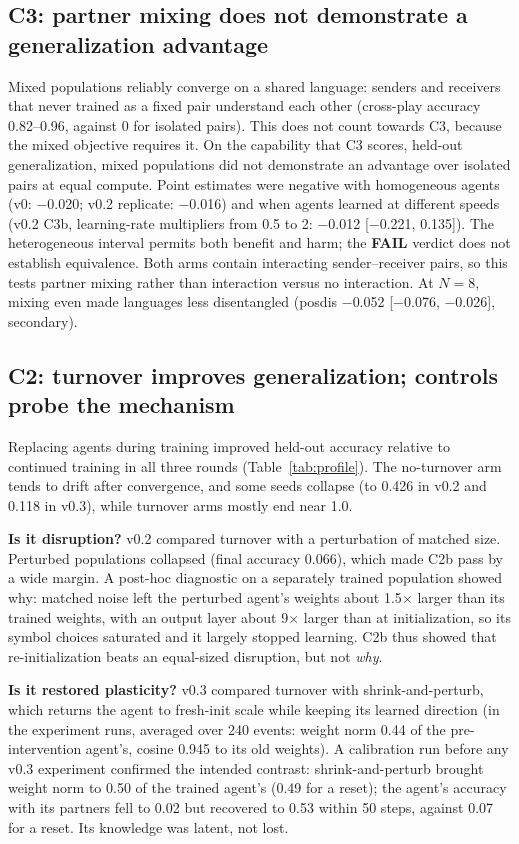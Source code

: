 \documentclass[11pt]{article}
\newcommand{\fail}{\textbf{FAIL}}
\begin{document}
\subsection{C3: partner mixing does not demonstrate a generalization advantage}
Mixed populations reliably converge on a shared language: senders and receivers that never trained
as a fixed pair understand each other (cross-play accuracy 0.82--0.96, against 0 for isolated
pairs). This does not count towards C3, because the mixed objective requires it. On the capability
that C3 scores, held-out generalization, mixed populations did not demonstrate an advantage over
isolated pairs at equal compute. Point estimates were negative with homogeneous agents (v0:
$-$0.020; v0.2 replicate: $-$0.016) and when agents learned at different speeds (v0.2 C3b,
learning-rate multipliers from 0.5 to 2: $-$0.012 [$-$0.221, 0.135]). The heterogeneous interval
permits both benefit and harm; the \fail{} verdict does not establish equivalence. Both arms
contain interacting sender--receiver pairs, so this tests partner mixing rather than interaction
versus no interaction. At $N{=}8$, mixing even made languages less disentangled (posdis
$-$0.052 [$-$0.076, $-$0.026], secondary).

\subsection{C2: turnover improves generalization; controls probe the mechanism}
Replacing agents during training improved held-out accuracy relative to continued training in all
three rounds (Table~\ref{tab:profile}). The no-turnover arm tends to drift after convergence, and
some seeds collapse (to 0.426 in v0.2 and 0.118 in v0.3), while turnover arms mostly end near 1.0.

\textbf{Is it disruption?} v0.2 compared turnover with a perturbation of matched size. Perturbed
populations collapsed (final accuracy 0.066), which made C2b pass by a wide margin. A post-hoc diagnostic on a separately trained population
showed why: matched noise left the perturbed agent's weights about 1.5$\times$ larger than its
trained weights, with an output layer about 9$\times$ larger than at initialization, so its symbol
choices saturated and it largely stopped learning. C2b thus showed that re-initialization beats an
equal-sized disruption, but not \emph{why}.

\textbf{Is it restored plasticity?} v0.3 compared turnover with shrink-and-perturb, which returns
the agent to fresh-init scale while keeping its learned direction (in the experiment runs, averaged
over 240 events: weight norm 0.44 of the pre-intervention agent's, cosine 0.945 to its old weights). A calibration run before any v0.3
experiment confirmed the intended contrast: shrink-and-perturb brought weight norm to 0.50 of the
trained agent's (0.49 for a reset); the agent's accuracy with its partners fell to 0.02 but recovered
to 0.53 within 50 steps, against 0.07 for a reset. Its knowledge
was latent, not lost.
\end{document}
